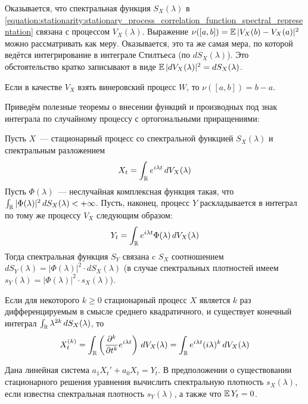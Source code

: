 Оказывается, что спектральная функция $ S_X(\lambda) $ в
\eqref{equation:stationarity:stationary_process_correlation_function_spectral_representation}
связана с процессом $ V_X(\lambda) $.
Выражение $ \nu([a, b]) = \operatorname{\mathbb{E}} |V_X(b) - V_X(a)|^2 $ можно рассматривать как меру.
Оказывается, это та же самая мера, по которой ведётся интегрирование в интеграле Стилтьеса (по $ dS_X(\lambda) $).
Это обстоятельство кратко записывают в виде $ \operatorname{\mathbb{E}}|dV_X(\lambda)|^2 = dS_X(\lambda) $.

\begin{example}
    \label{example:stationarity:Wiener_process_as_V}
    Если в качестве $ V_X $ взять винеровский процесс $ W $, то $ \nu([a, b]) = b - a $.
\end{example}

Приведём полезные теоремы о внесении функций и производных под знак интеграла
по случайному процессу с ортогональными приращениями:

\begin{theorem}
    \label{theorem:stationarity:spectral_functions_relation}
    Пусть $ X $~--- стационарный процесс со спектральной функцией $ S_X(\lambda) $ и спектральным разложением
    \[
        X_t = \int_{\mathbb{R}} e^{i \lambda t} \, dV_X(\lambda)
    \]
    Пусть $ \Phi(\lambda) $~--- неслучайная комплексная функция такая,
    что $ \int_{\mathbb{R}} |\Phi(\lambda)|^2 \, dS_X(\lambda) < +\infty $.
    Пусть, наконец, процесс $ Y $ раскладывается в интеграл по тому же процессу $ V_X $ следующим образом:
    \[
        Y_t = \int_{\mathbb{R}} e^{i \lambda t} \Phi(\lambda) \, dV_X(\lambda)
    \]
    Тогда спектральная функция $ S_Y $ связана c $ S_X $ соотношением $ dS_Y(\lambda) = |\Phi(\lambda)|^2 \cdot dS_X(\lambda) $
    (в случае спектральных плотностей имеем $ s_Y(\lambda) = |\Phi(\lambda)|^2 \cdot s_X(\lambda) $).
\end{theorem}

\begin{theorem}
    \label{theorem:stationarity:spectral_differentiation}
    Если для некоторого $ k \geqslant 0 $ стационарный процесс $ X $ является $ k $ раз дифференцируемым в смысле среднего квадратичного,
    и существует конечный интеграл $ \int_{\mathbb{R}} \lambda^{2 k} \, dS_X(\lambda) $, то
    \[
        X_t^{(k)} = \int_{\mathbb{R}} \left( \frac{\partial^k}{\partial t^k} e^{i \lambda t} \right) \, dV_X(\lambda) = \int_{\mathbb{R}} e^{i \lambda t} (i \lambda)^k \, dV_X(\lambda)
    \]
\end{theorem}

\begin{exercise}
    \label{exercise:stationarity:linear_system}
    Дана линейная система $ a_1 X_t' + a_0 X_t = Y_t $.
    В предположении о существовании стационарного решения уравнения
    вычислить спектральную плотность $ s_X(\lambda) $,
    если известна спектральная плотность $ s_Y(\lambda) $, а также что $ \operatorname{\mathbb{E}} Y_t = 0 $.
\end{exercise}

